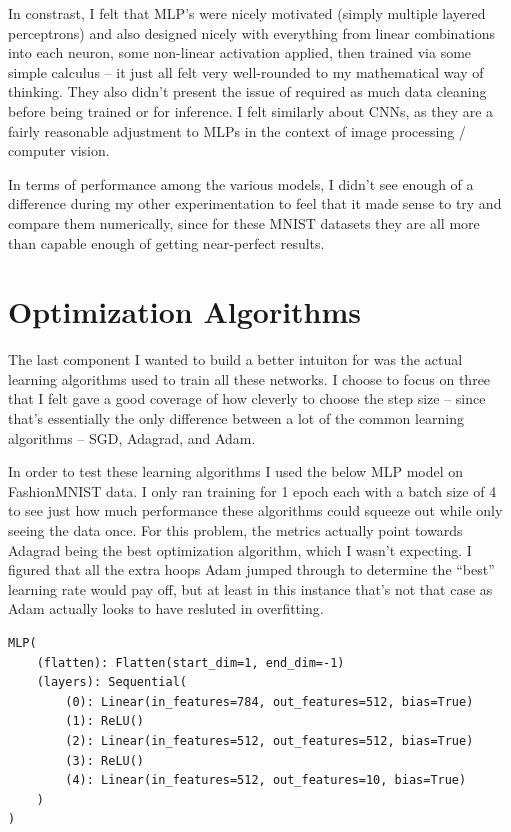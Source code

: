 \documentclass[12pt, twoside]{report}
\begin{document}
In constrast, I felt that MLP's were nicely motivated (simply multiple layered perceptrons) and also
designed nicely with everything from linear combinations into each neuron, some non-linear activation applied,
then trained via some simple calculus – it just all felt very well-rounded to my mathematical way of thinking.
They also didn't present the issue of required as much data cleaning before being trained or for inference.
I felt similarly about CNNs, as they are a fairly reasonable adjustment to MLPs in the context of
image processing / computer vision.

In terms of performance among the various models, I didn't see enough of a difference during my
other experimentation to feel that it made sense to try and compare them numerically, since for these
MNIST datasets they are all more than capable enough of getting near-perfect results.

\section{Optimization Algorithms}

The last component I wanted to build a better intuiton for was the actual learning algorithms used
to train all these networks. I choose to focus on three that I felt gave a good coverage of how 
cleverly to choose the step size – since that's essentially the only difference between a lot of the
common learning algorithms – SGD, Adagrad, and Adam.

In order to test these learning algorithms I used the below MLP model on FashionMNIST data. I only
ran training for 1 epoch each with a batch size of 4 to see just how much performance these algorithms 
could squeeze out while only seeing the data once. For this problem, the metrics actually point towards
Adagrad being the best optimization algorithm, which I wasn't expecting. I figured that all the 
extra hoops Adam jumped through to determine the ``best'' learning rate would pay off, but at least
in this instance that's not that case as Adam actually looks to have resluted in overfitting.

\begin{lstlisting}[style=Python,caption=MLP model used,label=lst:python]
MLP(
    (flatten): Flatten(start_dim=1, end_dim=-1)
    (layers): Sequential(
        (0): Linear(in_features=784, out_features=512, bias=True)
        (1): ReLU()
        (2): Linear(in_features=512, out_features=512, bias=True)
        (3): ReLU()
        (4): Linear(in_features=512, out_features=10, bias=True)
    )
)
\end{lstlisting}
\end{document}
